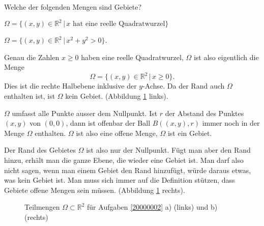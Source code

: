 Welche der folgenden Mengen sind Gebiete?
\begin{teilaufgaben}
\item $\Omega=\{(x,y)\in\mathbb R^2\,|\, \text{$x$ hat eine reelle Quadratwurzel}\}$
\item $\Omega=\{(x,y)\in\mathbb R^2\,|\, x^2+y^2>0\}$.
\end{teilaufgaben}


\begin{loesung}
\begin{teilaufgaben}
\item
Genau die Zahlen $x\ge 0$ haben eine reelle Quadratwurzel, $\Omega$ ist
also eigentlich die Menge
\[
\Omega=\{(x,y)\in\mathbb R^2\,|\, x\ge 0\}.
\]
Dies ist die rechte Halbebene inklusive der $y$-Achse. Da der Rand
auch $\Omega$ enthalten ist, ist $\Omega$ kein Gebiet.
(Abbildung \ref{20000002:fig} links).
\item
$\Omega$ umfasst alle Punkte ausser dem Nullpunkt. Ist $r$ der Abstand
des Punktes $(x,y)$ von $(0,0)$, dann ist offenbar der Ball $B((x,y),r)$
immer noch in der Menge $\Omega$ enthalten. $\Omega$ ist also eine offene
Menge, $\Omega$ ist ein Gebiet.

Der Rand des Gebietes $\Omega$ ist also nur der Nullpunkt. Fügt man
aber den Rand hinzu, erhält man die ganze Ebene, die wieder eine
Gebiet ist. Man darf also nicht sagen, wenn man einem Gebiet den Rand
hinzufügt, würde daraus etwas, was kein Gebiet ist. Man muss sich immer
auf die Definition stützen, dass Gebiete offene Mengen sein müssen.
(Abbildung \ref{20000002:fig} rechts).
\qedhere
\end{teilaufgaben}
\begin{figure}
\begin{center}
\qquad
{}
\end{center}
\caption{Teilmengen $\Omega\subset\mathbb R^2$ für Aufgaben \ref{20000002} a)
(links) 
und b) (rechts)\label{20000002:fig}}
\end{figure}
\end{loesung}
